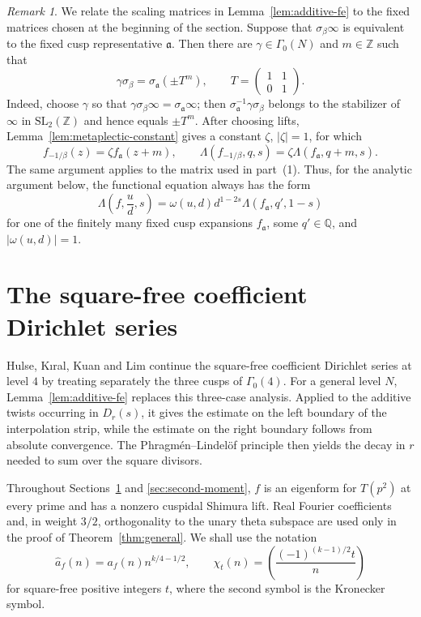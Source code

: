 \documentclass[11pt]{amsart}
\theoremstyle{remark}
\newtheorem{remark}[theorem]{Remark}
\newcommand{\Q}{\mathbb Q}
\newcommand{\Z}{\mathbb Z}
\begin{document}
\begin{remark}\label{rem:structural-fe}
We relate the scaling matrices in Lemma~\ref{lem:additive-fe} to the fixed
matrices chosen at the beginning of the section. Suppose that
$\sigma_\beta\infty$ is equivalent to the fixed cusp representative
$\mathfrak a$. Then there are $\gamma\in\Gamma_0(N)$ and $m\in\Z$ such
that
\[
\gamma\sigma_\beta=\sigma_{\mathfrak a}(\pm T^m),
\qquad
T=\begin{pmatrix}1&1\\0&1\end{pmatrix}.
\]
Indeed, choose $\gamma$ so that
$\gamma\sigma_\beta\infty=\sigma_{\mathfrak a}\infty$; then
$\sigma_{\mathfrak a}^{-1}\gamma\sigma_\beta$ belongs to the stabilizer
of $\infty$ in $\mathrm{SL}_2(\Z)$ and hence equals $\pm T^m$. After
choosing lifts, Lemma~\ref{lem:metaplectic-constant} gives a constant
$\zeta$, $|\zeta|=1$, for which
\[
f_{-1/\beta}(z)=\zeta f_{\mathfrak a}(z+m),
\qquad
\Lambda(f_{-1/\beta},q,s)
 =\zeta\Lambda(f_{\mathfrak a},q+m,s).
\]
The same argument applies to the matrix used in part~\textup{(1)}. Thus,
for the analytic argument below, the functional equation always has the
form
\[
\Lambda\left(f,\frac ud,s\right)
=\omega(u,d)d^{1-2s}\Lambda(f_{\mathfrak a},q',1-s)
\]
for one of the finitely many fixed cusp expansions $f_{\mathfrak a}$,
some $q'\in\Q$, and $|\omega(u,d)|=1$.
\end{remark}

\section{The square-free coefficient Dirichlet series}\label{sec:squarefree-series}

Hulse, K{\i}ral, Kuan and Lim continue the square-free coefficient
Dirichlet series at level $4$ by treating separately the three cusps of
$\Gamma_0(4)$. For a general level $N$, Lemma~\ref{lem:additive-fe}
replaces this three-case analysis. Applied to the additive twists occurring
in $D_r(s)$, it gives the estimate on the left boundary of the interpolation
strip, while the estimate on the right boundary follows from absolute
convergence. The Phragm\'en--Lindel\"of principle then yields the decay in
$r$ needed to sum over the square divisors.

Throughout Sections~\ref{sec:squarefree-series} and
\ref{sec:second-moment}, $f$ is an eigenform for $T(p^2)$ at every prime
and has a nonzero cuspidal Shimura lift. Real Fourier coefficients and, in
weight $3/2$, orthogonality to the unary theta subspace are used only in
the proof of Theorem~\ref{thm:general}. We shall use the notation
\[
\widehat a_f(n)=a_f(n)n^{k/4-1/2},
\qquad
\chi_t(n)=\left(\frac{(-1)^{(k-1)/2}t}{n}\right)
\]
for square-free positive integers $t$, where the second symbol is the
Kronecker symbol.
\end{document}
